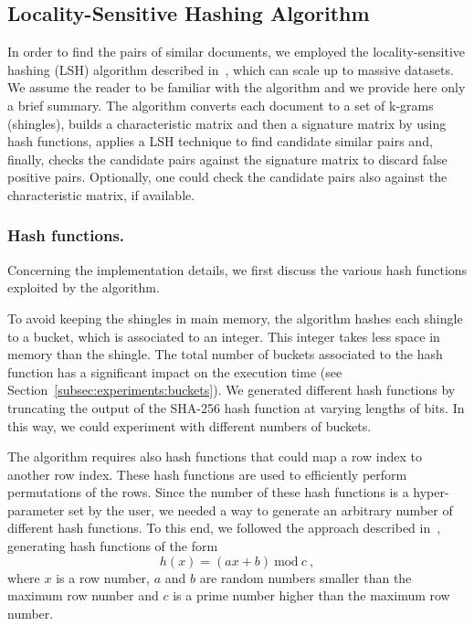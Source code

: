 \documentclass[runningheads]{llncs}
\begin{document}
\subsection{Locality-Sensitive Hashing Algorithm}
\label{subsec:models:lsh}

In order to find the pairs of similar documents, we employed the locality-sensitive hashing (LSH) algorithm described in~\cite{leskovec_2020}, which can scale up to massive datasets. We assume the reader to be familiar with the algorithm and we provide here only a brief summary. The algorithm converts each document to a set of k-grams (shingles), builds a characteristic matrix and then a signature matrix by using hash functions, applies a LSH technique to find candidate similar pairs and, finally, checks the candidate pairs against the signature matrix to discard false positive pairs. Optionally, one could check the candidate pairs also against the characteristic matrix, if available.

\subsubsection{Hash functions.} Concerning the implementation details, we first discuss the various hash functions exploited by the algorithm. 

To avoid keeping the shingles in main memory, the algorithm hashes each shingle to a bucket, which is associated to an integer. This integer takes less space in memory than the shingle. The total number of buckets associated to the hash function has a significant impact on the execution time (see Section~\ref{subsec:experiments:buckets}). We generated different hash functions by truncating the output of the SHA-256 hash function at varying lengths of bits. In this way, we could experiment with different numbers of buckets.  

The algorithm requires also hash functions that could map a row index to another row index. These hash functions are used to efficiently perform permutations of the rows. Since the number of these hash functions is a hyper-parameter set by the user, we needed a way to generate an arbitrary number of different hash functions. To this end, we followed the approach described in~\cite{liu_2015}, generating hash functions of the form
\[
  h(x) = (ax + b)~\text{mod}~c~,  
\]
where $x$ is a row number, $a$ and $b$ are random numbers smaller than the maximum row number and $c$ is a prime number higher than the maximum row number.
\end{document}
